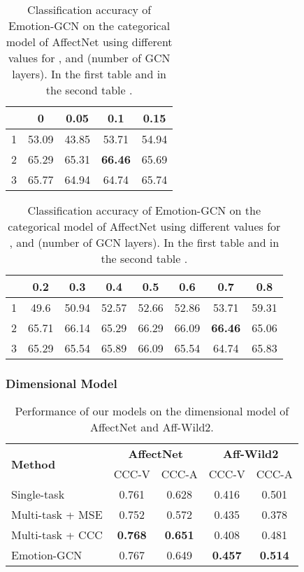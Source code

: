 \documentclass[a4paper, 10pt, conference]{ieeeconf}      \usepackage{FG2021}
\begin{document}
\begin{table}[t]
  \caption{Classification accuracy of Emotion-GCN on the categorical model of AffectNet using different values for ,  and  (number of GCN layers). In the first table  and in the second table .} 
  \label{table:results_parameters}
  \begin{center}
  \begin{tabular}{ccccc}
    \diagbox{}{} & 0 & 0.05 & 0.1 & 0.15 \\
    \toprule
    1 & 53.09 & 43.85 &  53.71	& 54.94\\
    2 & 65.29 & 65.31 & \textbf{66.46} & 65.69\\
    3 &	65.77 & 64.94 & 64.74	& 65.74\\
  \end{tabular}
  \begin{tabular}{cccccccc}
    \diagbox{}{} & 0.2 & 0.3 & 0.4 & 0.5 & 0.6 & 0.7 & 0.8 \\
    \toprule
    1 & 49.6 & 50.94 & 52.57 & 52.66 & 52.86 & 53.71 & 59.31 \\
    2 & 65.71 & 66.14 & 65.29 & 66.29 & 66.09 & \textbf{66.46} & 65.06 \\
    3 & 65.29 & 65.54 & 65.89 & 66.09 & 65.54 & 64.74 & 65.83 \\
  \end{tabular}
  \end{center}
\end{table}


\subsubsection{Dimensional Model} 

\begin{table}[t]
  \caption{Performance of our models on the dimensional model of AffectNet and Aff-Wild2.}
  \label{table:results_ours_dim}
  \begin{center}
  \begin{tabular}{lcccc}
    \multirow{2}{*}{\textbf{Method}} & \multicolumn{2}{c}{\textbf{AffectNet}} & \multicolumn{2}{c}{\textbf{Aff-Wild2}} \\
    & CCC-V & CCC-A & CCC-V & CCC-A \\
    \toprule
    Single-task            & 0.761 & 0.628 & 0.416 & 0.501\\
    Multi-task + MSE       & 0.752 & 0.572 & 0.435 & 0.378\\
    Multi-task + CCC       & \textbf{0.768} & \textbf{0.651} & 0.408 & 0.481\\
    Emotion-GCN            & 0.767 & 0.649 & \textbf{0.457} & \textbf{0.514}\\
  \end{tabular}
  \end{center}
\end{table}
\end{document}
